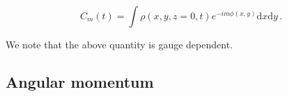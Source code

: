 \begin{equation}
\label{eq:modes}
C_m(t) = \int \rho(x,y,z=0,t) e^{-i m \phi(x,y)} \text{d}x \text{d} y \, .
\end{equation}

%
We note that the above quantity is gauge dependent.
%
%






\subsection{Angular momentum} \label{sec:bns_sims:method:ang_mom}



%

